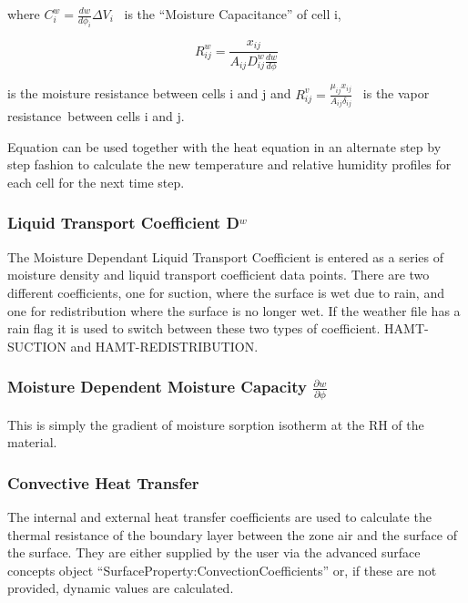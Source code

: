 where \(C_i^w = \frac{dw}{d\phi_{i}}\Delta {V_i}\) ~is the ``Moisture Capacitance'' of cell i,

\begin{equation}
R_{ij}^w = \frac{{{x_{ij}}}}{{{A_{ij}}D_{ij}^w\frac{{dw}}{{d\phi }}}}
\end{equation}

is the moisture resistance between cells i and j and \(R_{ij}^v = \frac{\mu_{ij}x_{ij}}{A_{ij}\delta_{ij}}\) ~is the vapor resistance~between cells i and j.

Equation can be used together with the heat equation in an alternate step by step fashion to calculate the new temperature and relative humidity profiles for each cell for the next time step.

\subsubsection{Liquid Transport Coefficient D\(^{w}\)}\label{liquid-transport-coefficient-dw}

The Moisture Dependant Liquid Transport Coefficient is entered as a series of moisture density and liquid transport coefficient data points. There are two different coefficients, one for suction, where the surface is wet due to rain, and one for redistribution where the surface is no longer wet. If the weather file has a rain flag it is used to switch between these two types of coefficient. HAMT-SUCTION and HAMT-REDISTRIBUTION.

\subsubsection{Moisture Dependent Moisture Capacity \(\frac{\partial w}{\partial \phi}\)}\label{moisture-dependent-moisture-capacity-fracpartial-wpartial-phi}

This is simply the gradient of moisture sorption isotherm at the RH of the material.

\subsubsection{Convective Heat Transfer}\label{convective-heat-transfer}

The internal and external heat transfer coefficients are used to calculate the thermal resistance of the boundary layer between the zone air and the surface of the surface. They are either supplied by the user via the advanced surface concepts object ``SurfaceProperty:ConvectionCoefficients'' or, if these are not provided, dynamic values are calculated.

